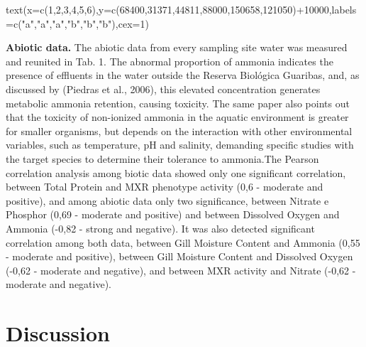 \documentclass[
  american,
  letterpaper,
  DIV=11,
  numbers=noendperiod]{scrartcl}
\newenvironment{Shaded}{}{}
\newcommand{\AttributeTok}[1]{\textcolor[rgb]{0.49,0.56,0.16}{#1}}
\newcommand{\DecValTok}[1]{\textcolor[rgb]{0.25,0.63,0.44}{#1}}
\newcommand{\FunctionTok}[1]{\textcolor[rgb]{0.02,0.16,0.49}{#1}}
\newcommand{\NormalTok}[1]{#1}
\newcommand{\SpecialCharTok}[1]{\textcolor[rgb]{0.25,0.44,0.63}{#1}}
\newcommand{\StringTok}[1]{\textcolor[rgb]{0.25,0.44,0.63}{#1}}
\begin{document}
\begin{Shaded}
\begin{Highlighting}[numbers=left,,]
\FunctionTok{text}\NormalTok{(}\AttributeTok{x=}\FunctionTok{c}\NormalTok{(}\DecValTok{1}\NormalTok{,}\DecValTok{2}\NormalTok{,}\DecValTok{3}\NormalTok{,}\DecValTok{4}\NormalTok{,}\DecValTok{5}\NormalTok{,}\DecValTok{6}\NormalTok{),}\AttributeTok{y=}\FunctionTok{c}\NormalTok{(}\DecValTok{68400}\NormalTok{,}\DecValTok{31371}\NormalTok{,}\DecValTok{44811}\NormalTok{,}\DecValTok{88000}\NormalTok{,}\DecValTok{150658}\NormalTok{,}\DecValTok{121050}\NormalTok{)}\SpecialCharTok{+}\DecValTok{10000}\NormalTok{,}\AttributeTok{labels=}\FunctionTok{c}\NormalTok{(}\StringTok{"a"}\NormalTok{,}\StringTok{"a"}\NormalTok{,}\StringTok{"a"}\NormalTok{,}\StringTok{"b"}\NormalTok{,}\StringTok{"b"}\NormalTok{,}\StringTok{"b"}\NormalTok{),}\AttributeTok{cex=}\DecValTok{1}\NormalTok{)}
\end{Highlighting}
\end{Shaded}

\textbf{Abiotic data.} The abiotic data from every sampling site water
was measured and reunited in Tab. 1. The abnormal proportion of ammonia
indicates the presence of effluents in the water outside the Reserva
Biológica Guaribas, and, as discussed by (Piedras et al., 2006), this
elevated concentration generates metabolic ammonia retention, causing
toxicity. The same paper also points out that the toxicity of
non-ionized ammonia in the aquatic environment is greater for smaller
organisms, but depends on the interaction with other environmental
variables, such as temperature, pH and salinity, demanding specific
studies with the target species to determine their tolerance to
ammonia.The Pearson correlation analysis among biotic data showed only
one significant correlation, between Total Protein and MXR phenotype
activity (0,6 - moderate and positive), and among abiotic data only two
significance, between Nitrate e Phosphor (0,69 - moderate and positive)
and between Dissolved Oxygen and Ammonia (-0,82 - strong and negative).
It was also detected significant correlation among both data, between
Gill Moisture Content and Ammonia (0,55 - moderate and positive),
between Gill Moisture Content and Dissolved Oxygen (-0,62 - moderate and
negative), and between MXR activity and Nitrate (-0,62 - moderate and
negative).

\section{Discussion}\label{discussion}
\end{document}
